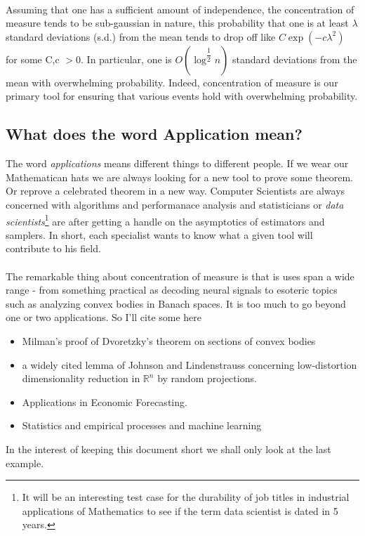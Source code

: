 \documentclass[12pt, oneside, a4paper]{article}
\theoremstyle{plain}
\theoremstyle{definition}
\newcommand{\gt}{>}
\begin{document}
\paragraph{} Assuming that one has a sufficient amount of independence, the concentration of measure tends to be
sub-gaussian in nature, this probability that one is at least $\lambda$ standard deviations (s.d.) from the mean tends
to drop off like $C\exp({-c\lambda^2})$ for some C,c $\gt 0$. In particular, one is $O(\log^{\dfrac{1}{2}}n)$ standard deviations
from the mean with overwhelming probability. Indeed, concentration of measure is our primary tool for ensuring that various
events hold with overwhelming probability.
\subsection{What does the word Application mean?}
The word \textit{applications} means different things to different people. If we wear our Mathematican hats we are always looking 
for a new tool to prove some theorem. Or reprove a celebrated theorem in a new way. 
Computer Scientists are always concerned with algorithms and performanace analysis and statisticians or
 \textit{data scientists}\footnote{It will be an interesting test case for the durability of job titles in industrial applications
of Mathematics to see if the term data scientist is dated in 5 years.} are after getting a handle on the 
asymptotics of estimators and samplers. 
In short, each specialist wants to know what a given tool will contribute to his field. 
\paragraph{} The remarkable thing about concentration of measure is that is uses span a wide range - from something practical as decoding neural signals to esoteric topics such as analyzing convex bodies in Banach spaces. 
It is too much to go beyond one or two applications.
So I'll cite some here 
\begin{itemize}
\item  Milman's proof of Dvoretzky's theorem on sections of convex bodies\cite{Milman}
\item a widely cited lemma of Johnson and Lindenstrauss concerning low-distortion dimensionality reduction in $\mathbb{R}^{n}$ by random projections\cite{JordanLipschitz}.
\item Applications in Economic Forecasting\cite{McDonald_TimeSeries}.
\item Statistics and empirical processes and machine learning\cite{SLT_Lugosi_Bocheron}
\end{itemize}
In the interest of keeping this document short we shall only look at the last example.
\end{document}
